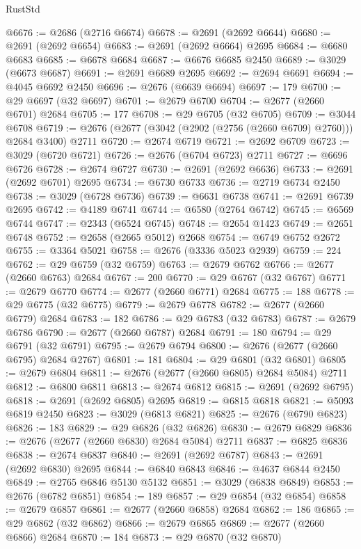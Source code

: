 \begin{lexlean}{RustStd}
\begin{coremodule}
@6676 := @2686 (@2716 @6674)
@6678 := @2691 (@2692 @6644)
@6680 := @2691 (@2692 @6654)
@6683 := @2691 (@2692 @6664) @2695
@6684 := @6680 @6683
@6685 := @6678 @6684
@6687 := @6676 @6685 @2450
@6689 := @3029 (@6673 @6687)
@6691 := @2691 @6689 @2695
@6692 := @2694 @6691
@6694 := @4045 @6692 @2450
@6696 := @2676 (@6639 @6694)
@6697 := 179
@6700 := @29 @6697 (@32 @6697)
@6701 := @2679 @6700
@6704 := @2677 (@2660 @6701) @2684
@6705 := 177
@6708 := @29 @6705 (@32 @6705)
@6709 := @3044 @6708
@6719 := @2676 (@2677 (@3042 (@2902 (@2756 (@2660 @6709) @2760))) @2684 @3400) @2711
@6720 := @2674 @6719
@6721 := @2692 @6709
@6723 := @3029 (@6720 @6721)
@6726 := @2676 (@6704 @6723) @2711
@6727 := @6696 @6726
@6728 := @2674 @6727
@6730 := @2691 (@2692 @6636)
@6733 := @2691 (@2692 @6701) @2695
@6734 := @6730 @6733
@6736 := @2719 @6734 @2450
@6738 := @3029 (@6728 @6736)
@6739 := @6631 @6738
@6741 := @2691 @6739 @2695
@6742 := @4189 @6741
@6744 := @6580 (@2764 @6742)
@6745 := @6569 @6744
@6747 := @2343 (@6524 @6745)
@6748 := @2654 @1423
@6749 := @2651 @6748
@6752 := @2658 (@2665 @5012) @2668
@6754 := @6749 @6752 @2672
@6755 := @3364 @5021
@6758 := @2676 (@3336 @5023 @2939)
@6759 := 224
@6762 := @29 @6759 (@32 @6759)
@6763 := @2679 @6762
@6766 := @2677 (@2660 @6763) @2684
@6767 := 200
@6770 := @29 @6767 (@32 @6767)
@6771 := @2679 @6770
@6774 := @2677 (@2660 @6771) @2684
@6775 := 188
@6778 := @29 @6775 (@32 @6775)
@6779 := @2679 @6778
@6782 := @2677 (@2660 @6779) @2684
@6783 := 182
@6786 := @29 @6783 (@32 @6783)
@6787 := @2679 @6786
@6790 := @2677 (@2660 @6787) @2684
@6791 := 180
@6794 := @29 @6791 (@32 @6791)
@6795 := @2679 @6794
@6800 := @2676 (@2677 (@2660 @6795) @2684 @2767)
@6801 := 181
@6804 := @29 @6801 (@32 @6801)
@6805 := @2679 @6804
@6811 := @2676 (@2677 (@2660 @6805) @2684 @5084) @2711
@6812 := @6800 @6811
@6813 := @2674 @6812
@6815 := @2691 (@2692 @6795)
@6818 := @2691 (@2692 @6805) @2695
@6819 := @6815 @6818
@6821 := @5093 @6819 @2450
@6823 := @3029 (@6813 @6821)
@6825 := @2676 (@6790 @6823)
@6826 := 183
@6829 := @29 @6826 (@32 @6826)
@6830 := @2679 @6829
@6836 := @2676 (@2677 (@2660 @6830) @2684 @5084) @2711
@6837 := @6825 @6836
@6838 := @2674 @6837
@6840 := @2691 (@2692 @6787)
@6843 := @2691 (@2692 @6830) @2695
@6844 := @6840 @6843
@6846 := @4637 @6844 @2450
@6849 := @2765 @6846 @5130 @5132
@6851 := @3029 (@6838 @6849)
@6853 := @2676 (@6782 @6851)
@6854 := 189
@6857 := @29 @6854 (@32 @6854)
@6858 := @2679 @6857
@6861 := @2677 (@2660 @6858) @2684
@6862 := 186
@6865 := @29 @6862 (@32 @6862)
@6866 := @2679 @6865
@6869 := @2677 (@2660 @6866) @2684
@6870 := 184
@6873 := @29 @6870 (@32 @6870)

\end{coremodule}
\end{lexlean}
